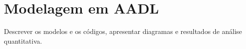 \chapter{Modelagem em AADL}
\label{cap:model}

Descrever os modelos e os códigos, apresentar diagramas e resultados de análise quantitativa.